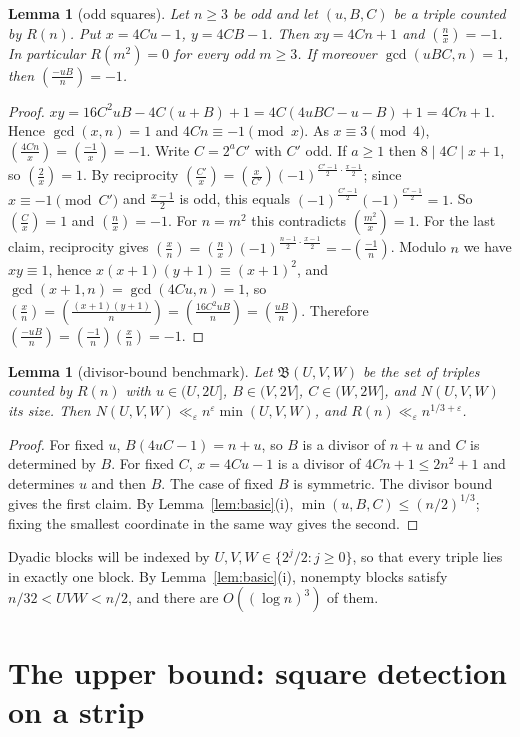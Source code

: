 \documentclass[11pt,reqno]{amsart}
\newtheorem{lemma}[theorem]{Lemma}
\theoremstyle{definition}
\newcommand{\eps}{\varepsilon}
\newcommand{\leg}[2]{\left(\frac{#1}{#2}\right)}
\begin{document}
\begin{lemma}[odd squares]\label{lem:squares}
Let $n\ge3$ be odd and let $(u,B,C)$ be a triple counted by $R(n)$.  Put
$x=4Cu-1$, $y=4CB-1$.  Then $xy=4Cn+1$ and $\leg nx=-1$.  In particular
$R(m^2)=0$ for every odd $m\ge 3$.  If moreover $\gcd(uBC,n)=1$, then
$\leg{-uB}{n}=-1$.
\end{lemma}
\begin{proof}
$xy=16C^2uB-4C(u+B)+1=4C(4uBC-u-B)+1=4Cn+1$.  Hence $\gcd(x,n)=1$ and
$4Cn\equiv-1\pmod x$.  As $x\equiv3\pmod 4$, $\leg{4Cn}{x}=\leg{-1}{x}=-1$.
Write $C=2^aC'$ with $C'$ odd.  If $a\ge1$ then $8\mid 4C\mid x+1$, so
$\leg 2x=1$.  By reciprocity
$\leg{C'}{x}=\leg{x}{C'}(-1)^{\frac{C'-1}2\cdot\frac{x-1}2}$; since
$x\equiv-1\pmod{C'}$ and $\frac{x-1}2$ is odd, this equals
$(-1)^{\frac{C'-1}2}(-1)^{\frac{C'-1}2}=1$.  So $\leg Cx=1$ and
$\leg nx=-1$.  For $n=m^2$ this contradicts $\leg{m^2}{x}=1$.
For the last claim, reciprocity gives
$\leg xn=\leg nx(-1)^{\frac{n-1}2\cdot\frac{x-1}2}=-\leg{-1}n$.  Modulo
$n$ we have $xy\equiv1$, hence $x(x+1)(y+1)\equiv(x+1)^2$, and
$\gcd(x+1,n)=\gcd(4Cu,n)=1$, so
$\leg xn=\leg{(x+1)(y+1)}n=\leg{16C^2uB}n=\leg{uB}n$.  Therefore
$\leg{-uB}n=\leg{-1}n\leg xn=-1$.
\end{proof}

\begin{lemma}[divisor-bound benchmark]\label{lem:trivial}
Let $\mathfrak B(U,V,W)$ be the set of triples counted by $R(n)$ with
$u\in(U,2U]$, $B\in(V,2V]$, $C\in(W,2W]$, and $N(U,V,W)$ its size.
Then $N(U,V,W)\ll_\eps n^{\eps}\min(U,V,W)$, and $R(n)\ll_\eps n^{1/3+\eps}$.
\end{lemma}
\begin{proof}
For fixed $u$, $B(4uC-1)=n+u$, so $B$ is a divisor of $n+u$ and $C$ is
determined by $B$.  For fixed $C$, $x=4Cu-1$ is a divisor of
$4Cn+1\le 2n^2+1$ and determines $u$ and then $B$.  The case of fixed $B$
is symmetric.  The divisor bound gives the first claim.  By
Lemma~\ref{lem:basic}(i), $\min(u,B,C)\le(n/2)^{1/3}$; fixing the
smallest coordinate in the same way gives the second.
\end{proof}

Dyadic blocks will be indexed by $U,V,W\in\{2^{j}/2:j\ge0\}$, so that
every triple lies in exactly one block.  By Lemma~\ref{lem:basic}(i),
nonempty blocks satisfy $n/32<UVW<n/2$, and there are $O((\log n)^3)$ of
them.

\section{The upper bound: square detection on a strip}\label{sec:upper}
\end{document}
